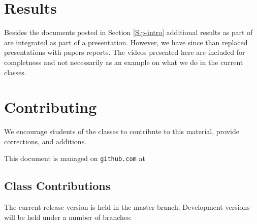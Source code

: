\begin{enumerate}
\section{Results}\label{S:results}

Besides the documents posted in Section \ref{S:p-intro}
additional results as part of are integrated as part of a
presentation. However, we have since than replaced presentations with
papers reports. The videos presented here are included for
completness and not necessarily as an example on what we do in the
current classes.








\section{Contributing}

We encourage students of the classes to contribute to this material,
provide corrections, and additions.

This document is managed on \verb|github.com| at 


\subsection{Class Contributions}

The current release version is held in the master branch.
Development versions will be held under a number of branches:


\end{enumerate}
